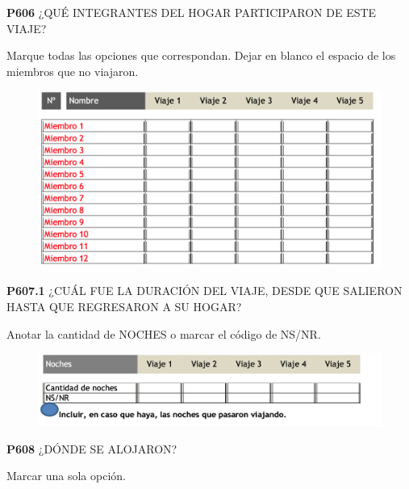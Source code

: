 \documentclass[
  openany]{book}
\begin{document}
\textbf{P606} ¿QUÉ INTEGRANTES DEL HOGAR PARTICIPARON DE ESTE VIAJE?

Marque todas las opciones que correspondan. Dejar en blanco el espacio de los miembros que no viajaron.

\begin{figure}

{\centering \includegraphics[width=1\linewidth]{imagenes/figura6-213} 

}

\end{figure}

\textbf{P607.1} ¿CUÁL FUE LA DURACIÓN DEL VIAJE, DESDE QUE SALIERON HASTA QUE REGRESARON A SU HOGAR?

Anotar la cantidad de NOCHES o marcar el código de NS/NR.

\begin{figure}

{\centering \includegraphics[width=1\linewidth]{imagenes/figura6-214} 

}

\end{figure}

\textbf{P608} ¿DÓNDE SE ALOJARON?

Marcar una sola opción.
\end{document}

